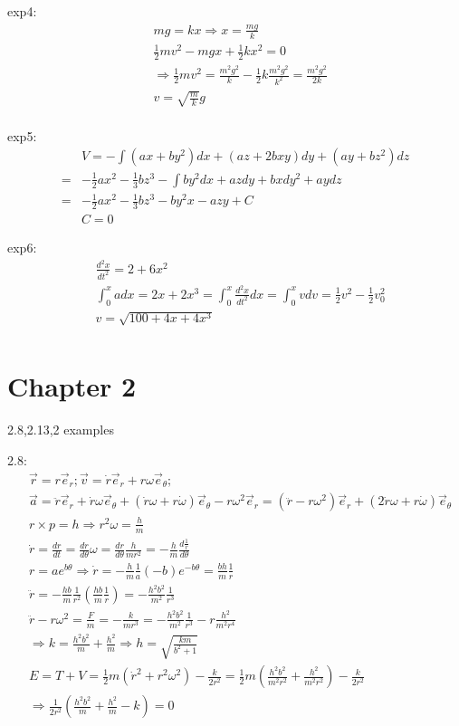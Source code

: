 \documentclass{article}
\begin{document}
exp4:
\begin{align*}
&mg=kx\Rightarrow x=\frac{mg}{k} \\
&\frac12mv^2-mgx+\frac12kx^2=0 \\
&\Rightarrow \frac12mv^2=\frac{m^2g^2}{k}-\frac12k\frac{m^2g^2}{k^2}=\frac{m^2g^2}{2k} \\
&v=\sqrt{\frac{m}k}g \\
\end{align*}

exp5:
\begin{align*}
&V=-\int (ax+by^2)dx+(az+2bxy)dy+(ay+bz^2)dz \\
  =&-\frac12ax^2-\frac13bz^3-\int by^2dx+azdy+bxdy^2+aydz\\
  =& -\frac12ax^2-\frac13bz^3-by^2x-azy+C\\
   &C=0
  \end{align*}

  exp6: 
  \begin{align*}
&\frac{d^2x}{dt^2}=2+6x^2 \\
&\int^x_0 adx=2x+2x^3=\int^x_0 \frac{d^2x}{dt^2}dx =\int^x_0vdv=\frac12v^2-\frac12v_0^2\\
&v=\sqrt{100+4x+4x^3} \\
  \end{align*}

  \section{Chapter 2}
2.8,2.13,2 examples

2.8:
\begin{align*}
&\vec r=r\vec e_r;\vec v=\dot {r}\vec e_r+r\omega\vec e_{\theta}; \\
&\vec a=\ddot r\vec e_r +\dot r\omega \vec e_{\theta}+(\dot r \omega+r\dot \omega)\vec e_{\theta}-r\omega^2 \vec e_r=(\ddot r-r\omega^2)\vec e_r+(2\dot r\omega+r\dot\omega)\vec e_{\theta} \\
&r\times p=h\Rightarrow r^2\omega =\frac hm \\
&\dot r=\frac{dr}{dt}=\frac{dr}{d\theta}\omega=\frac{dr}{d\theta}\frac h{mr^2}=-\frac hm\frac{d\frac1r}{d\theta} \\
&r=ae^{b\theta}\Rightarrow \dot r=-\frac hm \frac1a (-b)e^{-b\theta}=\frac{bh}{m}\frac1r \\
&\ddot r=-\frac{hb}m \frac1{r^2}(\frac{hb}m\frac1r)=-\frac{h^2b^2}{m^2}\frac1{r^3} \\
&\ddot r-r\omega^2=\frac{F}m=-\frac{k}{mr^3}=-\frac{h^2b^2}{m^2}\frac1{r^3}-r\frac{h^2}{m^2r^4} \\
&\Rightarrow k=\frac{h^2b^2}m+\frac{h^2}m\Rightarrow h=\sqrt{\frac{km}{b^2+1}} \\
&E=T+V=\frac12m(\dot r^2+r^2\omega^2)-\frac{k}{2r^2}=\frac12m(\frac{h^2b^2}{m^2r^2}+\frac{h^2}{m^2r^2})-\frac{k}{2r^2} \\
&\Rightarrow \frac1{2r^2}(\frac{h^2b^2}{m}+\frac{h^2}{m}-k)=0 \\
\end{align*}
\end{document}
